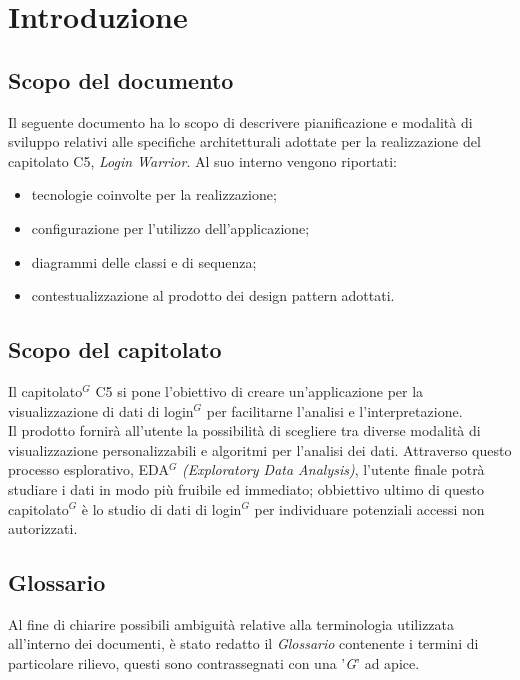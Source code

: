 \section{Introduzione}
\subsection{Scopo del documento}
Il seguente documento ha lo scopo di descrivere pianificazione e modalità di sviluppo relativi alle specifiche architetturali adottate per la realizzazione del capitolato C5, \textit{Login Warrior}.
Al suo interno vengono riportati:
\begin{itemize}
    \item tecnologie coinvolte per la realizzazione;
    \item configurazione per l'utilizzo dell'applicazione;
    \item diagrammi delle classi e di sequenza;
    \item contestualizzazione al prodotto dei design pattern adottati.
\end{itemize}

\subsection{Scopo del capitolato}
Il capitolato$^G$  C5 si pone l'obiettivo di creare un'applicazione per la visualizzazione di dati di login$^G$
per facilitarne l'analisi e l'interpretazione.\\
Il prodotto fornirà all'utente la possibilità di scegliere tra diverse
modalità di visualizzazione personalizzabili e algoritmi per l'analisi dei dati.
Attraverso questo processo esplorativo, EDA$^G$  \textit{(Exploratory Data Analysis)},
l'utente finale potrà studiare i dati in modo più fruibile ed immediato; obbiettivo ultimo
di questo capitolato$^G$  è lo studio di dati di login$^G$  per individuare potenziali accessi non autorizzati.

\subsection{Glossario}
Al fine di chiarire possibili ambiguità relative alla terminologia utilizzata all'interno dei documenti, è stato redatto il \textit{Glossario} contenente i termini di particolare rilievo,
questi sono contrassegnati con una '\textit{G}' ad apice.